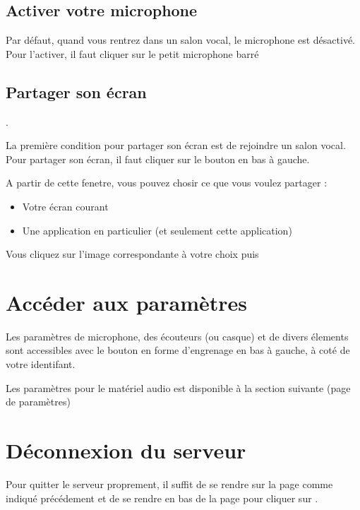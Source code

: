 \subsection{Activer votre microphone}

Par défaut, quand vous rentrez dans un salon vocal, le microphone est désactivé. Pour l'activer, il faut cliquer sur le petit microphone barré 




\subsection{Partager son écran}.

La première condition pour partager son écran est de rejoindre un salon vocal. \\

Pour partager son écran, il faut cliquer sur le bouton  en bas à gauche.


A partir de cette fenetre, vous pouvez chosir ce que vous voulez partager : 

	\begin{itemize}
		\item Votre écran courant
		\item Une application en particulier (et seulement cette application)
	\end{itemize}

	Vous cliquez sur l'image correspondante à votre choix puis 


\section{Accéder aux paramètres}

Les paramètres de microphone, des écouteurs (ou casque) et de divers élements sont accessibles avec le bouton en forme d'engrenage en bas à gauche, à coté de votre identifant.


Les paramètres pour le matériel audio est disponible à la section suivante (page de paramètres)



\section{Déconnexion du serveur}

Pour quitter le serveur proprement, il suffit de se rendre sur la page  comme indiqué précédement et de se rendre en bas de la page pour cliquer sur .

\newpage
{}
\listoffigures
